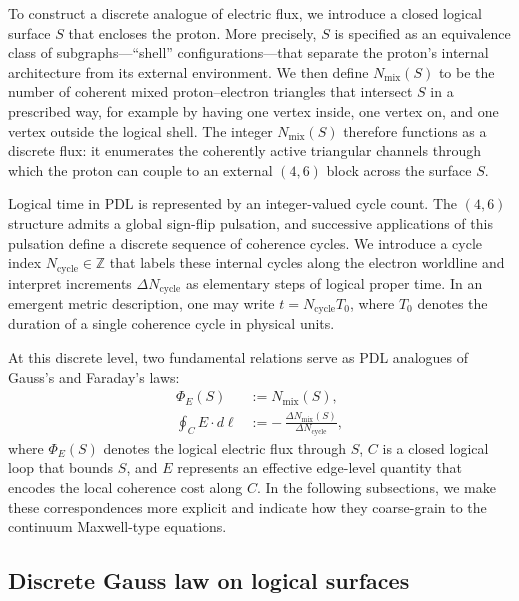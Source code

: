\documentclass[11pt,a4paper]{article}
\begin{document}
To construct a discrete analogue of electric flux, we introduce a closed logical surface $S$ that encloses the proton.
More precisely, $S$ is specified as an equivalence class of subgraphs—``shell'' configurations—that separate the proton’s internal architecture from its external environment.
We then define $N_{\mathrm{mix}}(S)$ to be the number of coherent mixed proton–electron triangles that intersect $S$ in a prescribed way, for example by having one vertex inside, one vertex on, and one vertex outside the logical shell.\cite{Laubscher2026SchrodingerSketch}
The integer $N_{\mathrm{mix}}(S)$ therefore functions as a discrete flux: it enumerates the coherently active triangular channels through which the proton can couple to an external $(4,6)$ block across the surface $S$.

Logical time in PDL is represented by an integer-valued cycle count.
The $(4,6)$ structure admits a global sign-flip pulsation, and successive applications of this pulsation define a discrete sequence of coherence cycles.\cite{Laubscher2026FullPDL}
We introduce a cycle index $N_{\mathrm{cycle}}\in\mathbb{Z}$ that labels these internal cycles along the electron worldline and interpret increments $\Delta N_{\mathrm{cycle}}$ as elementary steps of logical proper time.
In an emergent metric description, one may write $t = N_{\mathrm{cycle}} T_{0}$, where $T_{0}$ denotes the duration of a single coherence cycle in physical units.

At this discrete level, two fundamental relations serve as PDL analogues of Gauss’s and Faraday’s laws:
\begin{align}
\Phi_{E}(S) &:= N_{\mathrm{mix}}(S), \label{eq:phiEDef}\\
\oint_{C} E\cdot d\ell &:= -\,\frac{\Delta N_{\mathrm{mix}}(S)}{\Delta N_{\mathrm{cycle}}}, \label{eq:discreteFaradayDef}
\end{align}
where $\Phi_{E}(S)$ denotes the logical electric flux through $S$, $C$ is a closed logical loop that bounds $S$, and $E$ represents an effective edge-level quantity that encodes the local coherence cost along $C$.
In the following subsections, we make these correspondences more explicit and indicate how they coarse-grain to the continuum Maxwell-type equations.

\subsection{Discrete Gauss law on logical surfaces}
\end{document}
